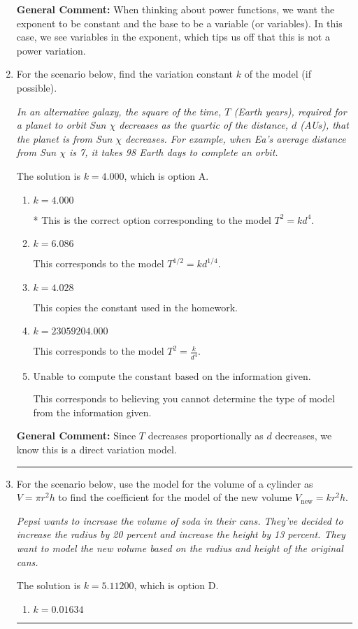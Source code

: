 \documentclass{extbook}[14pt]
\newcommand{\litem}[1]{\item #1

\rule{\textwidth}{0.4pt}}
\begin{document}
\begin{enumerate}
{\textbf{General Comment:} When thinking about power functions, we want the exponent to be constant and the base to be a variable (or variables). In this case, we see variables in the exponent, which tips us off that this is not a power variation.
}
\litem{
For the scenario below, find the variation constant $k$ of the model (if possible).

\begin{center}
    \textit{ In an alternative galaxy, the square of the time, $T$ (Earth years), required for a planet to orbit Sun $\chi$ decreases as the quartic of the distance, $d$ (AUs), that the planet is from Sun $\chi$ decreases. For example, when Ea's average distance from Sun $\chi$ is 7, it takes 98 Earth days to complete an orbit. }
\end{center}
The solution is \( k = 4.000 \), which is option A.\begin{enumerate}[label=\Alph*.]
\item \( k = 4.000 \)

* This is the correct option corresponding to the model $T^{2} = k d^{4}$.
\item \( k = 6.086 \)

This corresponds to the model $T^{1/2} = k d^{1/4}$.
\item \( k = 4.028 \)

This copies the constant used in the homework.
\item \( k = 23059204.000 \)

This corresponds to the model $T^{2} = \frac{k}{d^{4}}$.
\item \( \text{Unable to compute the constant based on the information given.} \)

This corresponds to believing you cannot determine the type of model from the information given.
\end{enumerate}

\textbf{General Comment:} Since $T$ decreases proportionally as $d$ decreases, we know this is a direct variation model.
}
\litem{
For the scenario below, use the model for the volume of a cylinder as $V = \pi r^2 h$ to find the coefficient for the model of the new volume $V_{\text{new}} = k r^2 h$.

\begin{center}
    \textit{ Pepsi wants to increase the volume of soda in their cans. They've decided to increase the radius by 20 percent and increase the height by 13 percent. They want to model the new volume based on the radius and height of the original cans. }
\end{center}
The solution is \( k = 5.11200 \), which is option D.\begin{enumerate}[label=\Alph*.]
\item \( k = 0.01634 \)


\end{enumerate}}
\end{enumerate}
\end{document}
